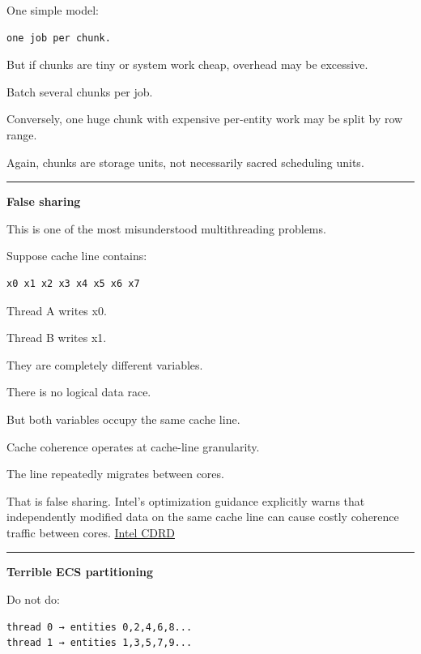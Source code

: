 One simple model:

\begin{verbatim}
one job per chunk.
\end{verbatim}

But if chunks are tiny or system work cheap, overhead may be excessive.

Batch several chunks per job.

Conversely, one huge chunk with expensive per-entity work may be split by row range.

Again, chunks are storage units, not necessarily sacred scheduling units.

\begin{center}\rule{0.5\linewidth}{0.5pt}\end{center}

\textbf{False sharing}

This is one of the most misunderstood multithreading problems.

Suppose cache line contains:

\begin{verbatim}
x0 x1 x2 x3 x4 x5 x6 x7
\end{verbatim}

Thread A writes x0.

Thread B writes x1.

They are completely different variables.

There is no logical data race.

But both variables occupy the same cache line.

Cache coherence operates at cache-line granularity.

The line repeatedly migrates between cores.

That is false sharing. Intel's optimization guidance explicitly warns that independently modified data on the same cache line can cause costly coherence traffic between cores. \href{https://cdrdv2-public.intel.com/814198/248966-Optimization-Reference-Manual-V1-049.pdf?utm_source=chatgpt.com}{Intel CDRD}

\begin{center}\rule{0.5\linewidth}{0.5pt}\end{center}

\textbf{Terrible ECS partitioning}

Do not do:

\begin{verbatim}
thread 0 → entities 0,2,4,6,8...
thread 1 → entities 1,3,5,7,9...
\end{verbatim}

